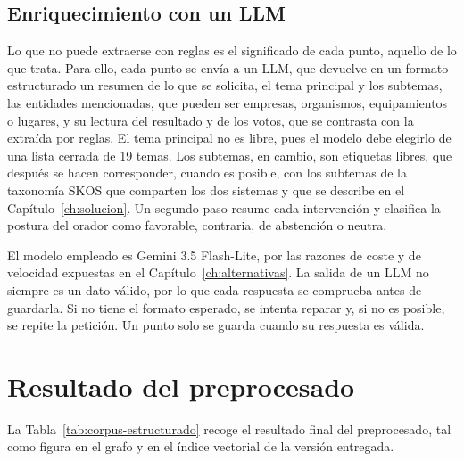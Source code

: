 \documentclass[11pt, a4paper]{report}
\begin{document}
	\subsection{Enriquecimiento con un LLM}

	Lo que no puede extraerse con reglas es el significado de cada punto, aquello de lo que trata. Para ello, cada punto se envía a un LLM, que devuelve en
	un formato estructurado un resumen de lo que se solicita, el tema principal y
	los subtemas, las entidades mencionadas, que pueden ser empresas, organismos,
	equipamientos o lugares, y su lectura del resultado y de los votos, que se
	contrasta con la extraída por reglas. El tema principal no es libre, pues el modelo debe elegirlo de una lista cerrada de 19 temas. Los subtemas, en cambio, son
	etiquetas libres, que después se hacen corresponder, cuando es posible, con
	los subtemas de la taxonomía SKOS que comparten los dos sistemas y que se
	describe en el Capítulo~\ref{ch:solucion}. Un segundo paso resume cada
	intervención y clasifica la postura del orador como favorable, contraria, de
	abstención o neutra.

	El modelo empleado es Gemini 3.5 Flash-Lite, por las razones de coste y de
	velocidad expuestas en el Capítulo~\ref{ch:alternativas}. La salida de un LLM
	no siempre es un dato válido, por lo que cada respuesta se comprueba antes de
	guardarla. Si no tiene el formato esperado, se intenta reparar y, si no es
	posible, se repite la petición. Un punto solo se guarda cuando su respuesta es
	válida.

	\section{Resultado del preprocesado}

	La Tabla~\ref{tab:corpus-estructurado} recoge el resultado final del
	preprocesado, tal como figura en el grafo y en el índice vectorial de la
	versión entregada.
\end{document}

